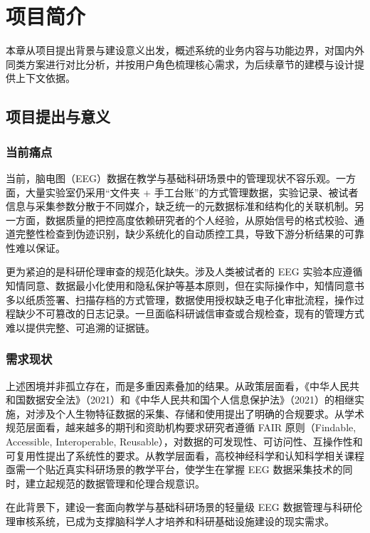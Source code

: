\section{项目简介}

本章从项目提出背景与建设意义出发，概述系统的业务内容与功能边界，对国内外同类方案进行对比分析，并按用户角色梳理核心需求，为后续章节的建模与设计提供上下文依据。

\subsection{项目提出与意义}

\subsubsection{当前痛点}

当前，脑电图（EEG）数据在教学与基础科研场景中的管理现状不容乐观。一方面，大量实验室仍采用``文件夹 + 手工台账''的方式管理数据，实验记录、被试者信息与采集参数分散于不同媒介，缺乏统一的元数据标准和结构化的关联机制。另一方面，数据质量的把控高度依赖研究者的个人经验，从原始信号的格式校验、通道完整性检查到伪迹识别，缺少系统化的自动质控工具，导致下游分析结果的可靠性难以保证。

更为紧迫的是科研伦理审查的规范化缺失。涉及人类被试者的 EEG 实验本应遵循知情同意、数据最小化使用和隐私保护等基本原则，但在实际操作中，知情同意书多以纸质签署、扫描存档的方式管理，数据使用授权缺乏电子化审批流程，操作过程缺少不可篡改的日志记录。一旦面临科研诚信审查或合规检查，现有的管理方式难以提供完整、可追溯的证据链。

\subsubsection{需求现状}

上述困境并非孤立存在，而是多重因素叠加的结果。从政策层面看，《中华人民共和国数据安全法》（2021）和《中华人民共和国个人信息保护法》（2021）的相继实施，对涉及个人生物特征数据的采集、存储和使用提出了明确的合规要求。从学术规范层面看，越来越多的期刊和资助机构要求研究者遵循 FAIR 原则（Findable, Accessible, Interoperable, Reusable），对数据的可发现性、可访问性、互操作性和可复用性提出了系统性的要求。从教学层面看，高校神经科学和认知科学相关课程亟需一个贴近真实科研场景的教学平台，使学生在掌握 EEG 数据采集技术的同时，建立起规范的数据管理和伦理合规意识。

在此背景下，建设一套面向教学与基础科研场景的轻量级 EEG 数据管理与科研伦理审核系统，已成为支撑脑科学人才培养和科研基础设施建设的现实需求。

